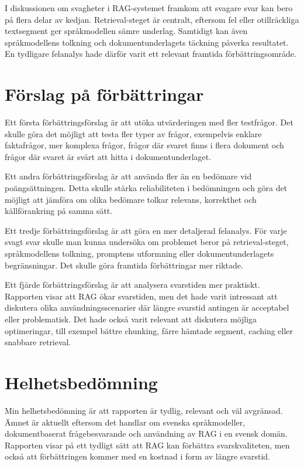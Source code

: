 \documentclass[12pt,a4paper]{article}
\begin{document}
I diskussionen om svagheter i RAG-systemet framkom att svagare svar kan bero på flera delar av kedjan. Retrieval-steget är centralt, eftersom fel eller otillräckliga textsegment ger språkmodellen sämre underlag. Samtidigt kan även språkmodellens tolkning och dokumentunderlagets täckning påverka resultatet. En tydligare felanalys hade därför varit ett relevant framtida förbättringsområde.



\section{Förslag på förbättringar}

Ett första förbättringsförslag är att utöka utvärderingen med fler testfrågor. Det skulle göra det möjligt att testa fler typer av frågor, exempelvis enklare faktafrågor, mer komplexa frågor, frågor där svaret finns i flera dokument och frågor där svaret är svårt att hitta i dokumentunderlaget.

Ett andra förbättringsförslag är att använda fler än en bedömare vid poängsättningen. Detta skulle stärka reliabiliteten i bedömningen och göra det möjligt att jämföra om olika bedömare tolkar relevans, korrekthet och källförankring på samma sätt.

Ett tredje förbättringsförslag är att göra en mer detaljerad felanalys. För varje svagt svar skulle man kunna undersöka om problemet beror på retrieval-steget, språkmodellens tolkning, promptens utformning eller dokumentunderlagets begränsningar. Det skulle göra framtida förbättringar mer riktade.

Ett fjärde förbättringsförslag är att analysera svarstiden mer praktiskt. Rapporten visar att RAG ökar svarstiden, men det hade varit intressant att diskutera olika användningsscenarier där längre svarstid antingen är acceptabel eller problematisk. Det hade också varit relevant att diskutera möjliga optimeringar, till exempel bättre chunking, färre hämtade segment, caching eller snabbare retrieval.

\section{Helhetsbedömning}

Min helhetsbedömning är att rapporten är tydlig, relevant och väl avgränsad. Ämnet är aktuellt eftersom det handlar om svenska språkmodeller, dokumentbaserat frågebesvarande och användning av RAG i en svensk domän. Rapporten visar på ett tydligt sätt att RAG kan förbättra svarskvaliteten, men också att förbättringen kommer med en kostnad i form av längre svarstid.
\end{document}
